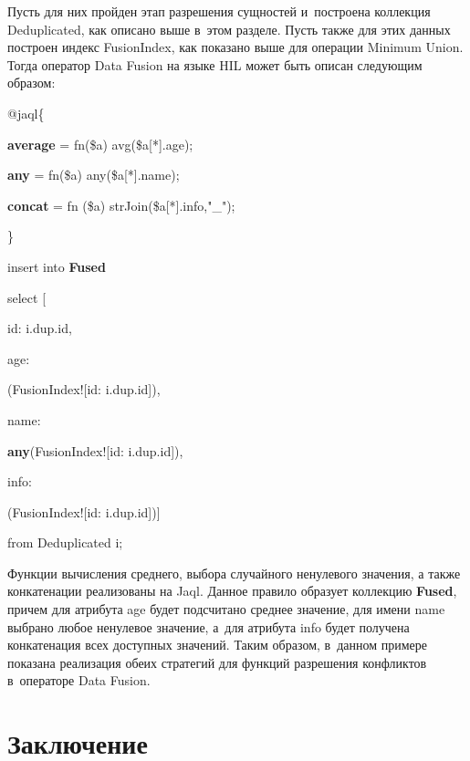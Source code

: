 \begin{multicols}{2}
{}

  Пусть для них пройден этап разрешения сущностей и~построена коллекция Deduplicated,
как описано выше в~этом разделе. Пусть также для этих данных построен индекс
FusionIndex, как показано выше для операции Minimum Union. Тогда оператор Data Fusion на
языке HIL может быть описан следующим образом:

{\sf
\noindent
  @jaql\{

\noindent
  {\textbf{average}} = fn(\$a) avg(\$a[*].age);

\noindent
  {\textbf{any}} = fn(\$a) any(\$a[*].name);

\noindent
  {\textbf{concat}} = fn (\$a) strJoin(\$a[*].info,"\_");

\noindent
  \}


  \vspace*{3pt}

\noindent
insert into {\textbf{Fused}}

\noindent
select [

\noindent
id: i.dup.id,

\noindent
age:

\noindent
    (FusionIndex![id: i.dup.id]),

\noindent
name:

\hspace*{6pt}

\noindent
{\textbf{any}}(FusionIndex![id: i.dup.id]),

\noindent
info:

\noindent
    (FusionIndex![id: i.dup.id])]

\noindent
from Deduplicated i;

}

  Функции вычисления среднего, выбора случайного ненулевого значения, а также
конкатенации реализованы на Jaql. Данное правило образует коллекцию \textbf{Fused},
причем для атрибута {\sf age} будет подсчитано среднее значение, для имени {\sf name}
выбрано любое ненулевое значение, а~для атрибута {\sf info} будет получена
конкатенация всех доступных значений. Таким образом, в~данном примере показана
реализация обеих стратегий для функций разрешения конфликтов в~операторе Data Fusion.

\section{Заключение}


\end{multicols}
